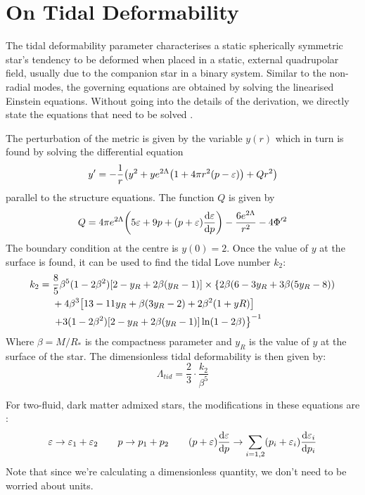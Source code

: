 \documentclass[a4paper,12pt,onehalfspacing]{report}
\begin{document}
\section{On Tidal Deformability}

The tidal deformability parameter characterises a static spherically symmetric star's tendency to be deformed when placed in a static, external quadrupolar field, usually due to the companion star in a binary system. Similar to the non-radial modes, the governing equations are obtained by solving the linearised Einstein equations. Without going into the details of the derivation, we directly state the equations that need to be solved \cite{Hinderer_tidal,Kwing_Leung_DM_tide}.

The perturbation of the metric is given by the variable $y(r)$ which in turn is found by solving the differential equation
\[y' = -\frac{1}{r}\qty(y^2+ ye^{2\Lambda}\qty(1+ 4\pi r^2(p- \varepsilon))+ Qr^2)\]
parallel to the structure equations. The function $Q$ is given by
\[Q= 4\pi e^{2\Lambda}\qty(5\varepsilon+ 9p+ (p+\varepsilon)\dv{\varepsilon}{p})- \frac{6e^{2\Lambda}}{r^2}- 4\Phi'^2\]
The boundary condition at the centre is $y(0)= 2$. Once the value of $y$ at the surface is found, it can be used to find the tidal Love number $k_2$:
\begin{align*}
    k_2={}& \frac{8}{5}\beta^5(1-2\beta^2)\qty[2-y_R+2\beta(y_R-1)]\times\left\{2\beta(6-3y_R+3\beta(5y_R-8))\right.\\
    &+4\beta^3\qty[13-11y_R+\beta(3y_R-2)+2\beta^2(1+yR)]\\
    &\left.+3(1-2\beta^2)\qty[2-y_R+2\beta(y_R-1)]\ln(1-2\beta)\right\}^{-1}
\end{align*}
Where $\beta= M/R_*$ is the compactness parameter and $y_R$ is the value of $y$ at the surface of the star. The dimensionless tidal deformability is then given by: 
\begin{equation}
    \Lambda_{tid}= \frac{2}{3}\cdot \frac{k_2}{\beta^5} 
\end{equation}

For two-fluid, dark matter admixed stars, the modifications in these equations are \cite{A_Das_Two_fluid}:
\begin{align*}
    \varepsilon\to \varepsilon_1+\varepsilon_2\qquad p\to p_1+p_2\qquad(p+\varepsilon)\dv{\varepsilon}{p}\to \sum_{i=1,2} (p_i+\varepsilon_i)\dv{\varepsilon_i}{p_i}
\end{align*}
Note that since we're calculating a dimensionless quantity, we don't need to be worried about units. 
\end{document}

